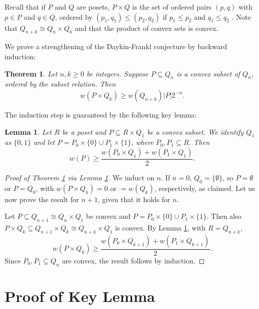\documentclass[12pt]{article}
\newtheorem{theorem}[problem]{Theorem}
\newtheorem{lemma}[problem]{Lemma}
\begin{document}
Recall that if $P$ and $Q$ are posets, $P\times Q$ is the set of ordered pairs $(p,q)$ with $p\in P$ and $q\in Q$, ordered by $(p_1,q_1)\le (p_2,q_2)$ if $p_1\le p_2$ and $q_1\le q_2$ \cite{Wil}. Note that $Q_{n+k}\cong Q_n\times Q_k$ and that the product of convex sets is convex.

We prove a strengthening of the Daykin-Frankl conjecture by backward induction:

\begin{theorem} \label{main}
    Let $n,k\ge 0$ be integers. Suppose $P\subseteq Q_n$ is a convex subset of $Q_n$, ordered by the subset relation. Then
    $$w(P\times Q_k)\ge w(Q_{n+k})|P|2^{-n}.$$
\end{theorem}

The induction step is guaranteed by the following key lemma:

\begin{lemma} \label{key}
    Let $R$ be a poset and $P\subseteq R\times Q_1$ be a convex subset. We identify $Q_1$ as $\{0,1\}$ and let $P=P_0\times \{0\}\cup P_1\times \{1\}$, where $P_0,P_1\subseteq R$. Then
    $$w(P)\ge \frac{w(P_0\times Q_1)+w(P_1\times Q_1)}{2}.$$
\end{lemma}

\begin{proof}[Proof of Theorem \ref{main} via Lemma \ref{key}]
    We induct on $n$. If $n=0$, $Q_0=\{\emptyset\}$, so $P=\emptyset$ or $P=Q_0$, with $w(P\times Q_k)=0$ or $=w(Q_k)$, respectively, as claimed. Let us now prove the result for $n+1$, given that it holds for $n$.

    Let $P\subseteq Q_{n+1}\cong Q_n\times Q_1$ be convex and $P=P_0\times \{0\}\cup P_1\times\{1\}$. Then also $P\times Q_k\subseteq Q_{n+1}\times Q_k\cong Q_{n+k}\times Q_1$ is convex. By Lemma \ref{key}, with $R=Q_{n+k}$,
    $$w(P\times Q_k)\ge \frac{w(P_0\times Q_{k+1})+w(P_1\times Q_{k+1})}{2}.$$
    Since $P_0,P_1\subseteq Q_n$ are convex, the result follows by induction.    
\end{proof}

\section{Proof of Key Lemma}
\end{document}

